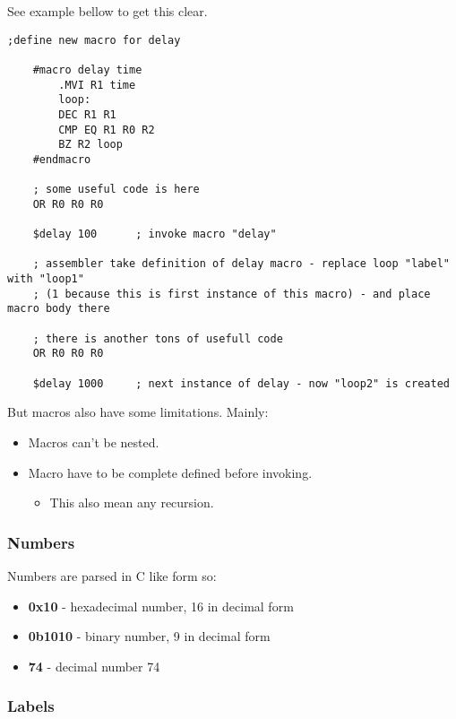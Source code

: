 See example bellow to get this clear.

\begin{lstlisting}[language={[x86masm]Assembler}, frame=single]
    ;define new macro for delay

    #macro delay time
        .MVI R1 time
        loop:
        DEC R1 R1
        CMP EQ R1 R0 R2
        BZ R2 loop
    #endmacro

    ; some useful code is here
    OR R0 R0 R0

    $delay 100      ; invoke macro "delay"

    ; assembler take definition of delay macro - replace loop "label" with "loop1"
    ; (1 because this is first instance of this macro) - and place macro body there

    ; there is another tons of usefull code
    OR R0 R0 R0

    $delay 1000     ; next instance of delay - now "loop2" is created
\end{lstlisting}

But macros also have some limitations. Mainly:

\begin{itemize}
    \item Macros can't be nested.
    \item Macro have to be complete defined before invoking.
    \begin{itemize}
        \item This also mean any recursion.
    \end{itemize}
\end{itemize}

\subsubsection{Numbers}

Numbers are parsed in C like form so:

\begin{itemize}
    \item \textbf{0x10} - hexadecimal number, 16 in decimal form
    \item \textbf{0b1010} - binary number, 9 in decimal form
    \item \textbf{74} - decimal number 74
\end{itemize}

\subsubsection{Labels}

